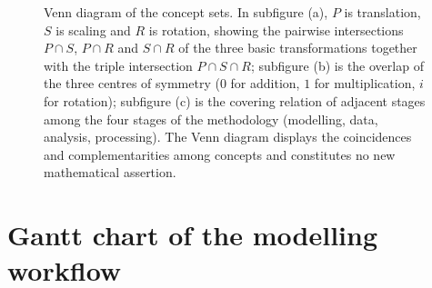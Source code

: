\begin{figure}[htbp]
    \caption{Venn diagram of the concept sets. In subfigure (a), $P$ is translation, $S$ is scaling and $R$ is rotation,
             showing the pairwise intersections $P{\cap}S$, $P{\cap}R$ and $S{\cap}R$ of the three basic transformations
             together with the triple intersection $P{\cap}S{\cap}R$;
             subfigure (b) is the overlap of the three centres of symmetry ($0$ for addition, $1$ for multiplication, $i$ for rotation);
             subfigure (c) is the covering relation of adjacent stages among the four stages of the methodology (modelling, data, analysis, processing).
             The Venn diagram displays the coincidences and complementarities among concepts and constitutes no new mathematical assertion.}
    \label{fig:venn_concepts}
\end{figure}

\newpage

\section{Gantt chart of the modelling workflow}

